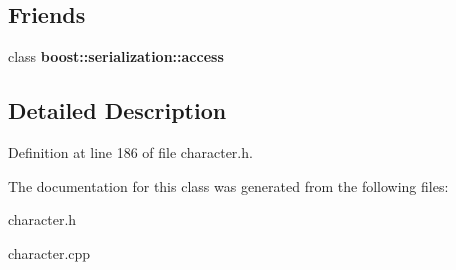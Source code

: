 \subsection*{Friends}
\begin{DoxyCompactItemize}
\item 
\hypertarget{class_enemy_ac98d07dd8f7b70e16ccb9a01abf56b9c}{}\label{class_enemy_ac98d07dd8f7b70e16ccb9a01abf56b9c} 
class {\bfseries boost\+::serialization\+::access}
\end{DoxyCompactItemize}


\subsection{Detailed Description}


Definition at line 186 of file character.\+h.



The documentation for this class was generated from the following files\+:\begin{DoxyCompactItemize}
\item 
character.\+h\item 
character.\+cpp\end{DoxyCompactItemize}
